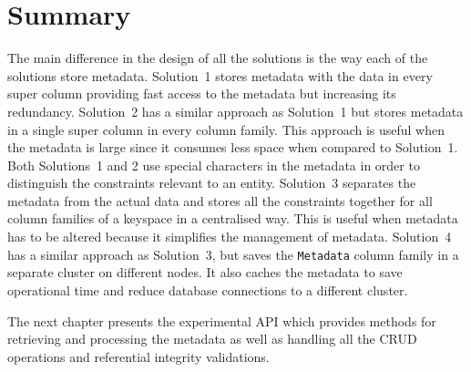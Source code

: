 \section{Summary}\label{s:Design-summary}
The main difference in the design of all the  solutions is the way each of the
solutions store metadata.    Solution~1 stores metadata with the data in every
super column providing fast access to the metadata but increasing its
redundancy. 
Solution~2 has a similar approach as Solution~1 but stores metadata in a single
super column in every column family.   This approach is useful when the metadata
is large since it consumes less space when compared to Solution~1. 
Both Solutions~1 and 2 use special characters in the metadata in order to
distinguish the  constraints relevant to an entity. 
Solution~3 separates the metadata from the actual data and stores all the
constraints together for all column families of a keyspace  in a centralised
way.    This is useful when metadata has to be  altered because it simplifies the
management of metadata.  
Solution~4 has a similar approach as Solution~3,  but saves the \texttt{Metadata}
column family in a separate cluster on different nodes.    It also caches the
metadata  to save operational time and reduce database connections to a
different cluster. 

The next chapter presents the  experimental \ac{API} which provides methods for
 retrieving and processing the metadata as well as handling all the \ac{CRUD}
 operations and referential integrity validations.  





